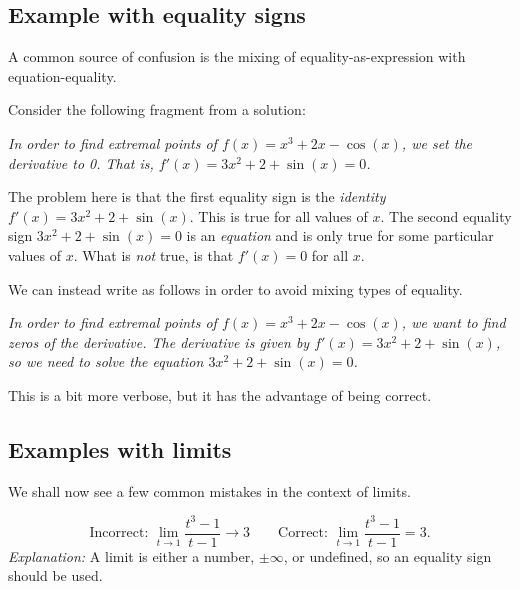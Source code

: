 \subsection[mistakesTypesEqual]{Example with equality signs}

A common source of confusion is the mixing of equality-as-expression with equation-equality.
\begin{example}
Consider the following fragment from a solution:

\emph{
In order to find extremal points of $f(x)=x^3+2x-\cos(x)$, we set the derivative to 0.
That is, $f'(x) = 3x^2+2+\sin(x)=0$.
}

The problem here is that the first equality sign is the \emph{identity}
$f'(x) = 3x^2+2+\sin(x)$.  This is true for all values of $x$.
The second equality sign $3x^2+2+\sin(x)=0$ is an \emph{equation} and is only
true for some particular values of $x$.
What is \emph{not} true, is that $f'(x)=0$ for all $x$.

We can instead write as follows in order to avoid mixing types of equality.

\emph{
In order to find extremal points of $f(x)=x^3+2x-\cos(x)$, we want to find
zeros of the derivative.
The derivative is given by $f'(x) = 3x^2+2+\sin(x)$,
so we need to solve the equation $3x^2+2+\sin(x) = 0$.
}

This is a bit more verbose, but it has the advantage of being correct.

\end{example}



\subsection[mistakesTypesLimits]{Examples with limits}


We shall now see a few common mistakes in the context of limits.

\begin{example}
\[
\text{Incorrect: } 
\lim_{t\to 1} \frac{t^3-1}{t-1} \to 3
\qquad 
\text{Correct: } 
\lim_{t\to 1} \frac{t^3-1}{t-1} = 3.
\]
\emph{Explanation:} A limit is either a number, $\pm \infty$, or undefined,
so an equality sign should be used.
\end{example}

